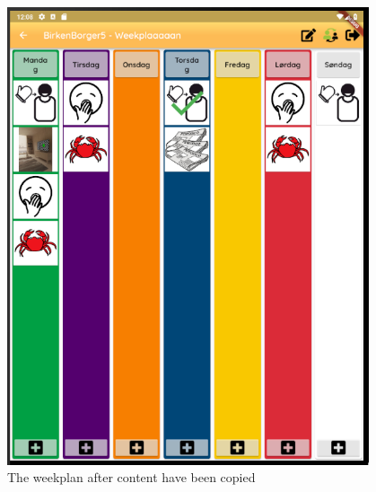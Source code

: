 \begin{figure}[H]
    \begin{center}
        \includegraphics[width=0.95\textwidth]{figures/FinalScreen/editWeekplanScreenAfterCopy.png}
    \end{center}
    \caption{The weekplan after content have been copied}
    \label{fig:finalWeekplanAfterCopy}
\end{figure}

